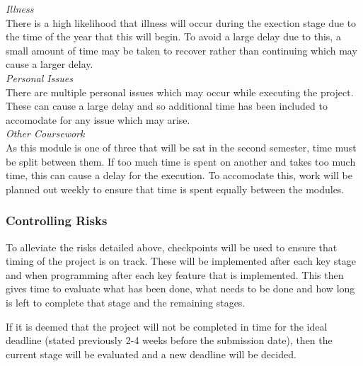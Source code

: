 \documentclass[11pt,a4paper]{article}
\begin{document}
\textit{Illness}\\
There is a high likelihood that illness will occur during the exection stage due to the time of the year that this will begin. To avoid a large delay due to this, a small amount of time may be taken to recover rather than continuing which may cause a larger delay.\\

\textit{Personal Issues}\\
There are multiple personal issues which may occur while executing the project. These can cause a large delay and so additional time has been included to accomodate for any issue which may arise.\\

\textit{Other Coursework}\\
As this module is one of three that will be sat in the second semester, time must be split between them. If too much time is spent on another and takes too much time, this can cause a delay for the execution. To accomodate this, work will be planned out weekly to ensure that time is spent equally between the modules.\\

\subsubsection{Controlling Risks}

To alleviate the risks detailed above, checkpoints will be used to ensure that timing of the project is on track. These will be implemented after each key stage and when programming after each key feature that is implemented. This then gives time to evaluate what has been done, what needs to be done and how long is left to complete that stage and the remaining stages.

If it is deemed that the project will not be completed in time for the ideal deadline (stated previously 2-4 weeks before the submission date), then the current stage will be evaluated and a new deadline will be decided. 




\end{document}
